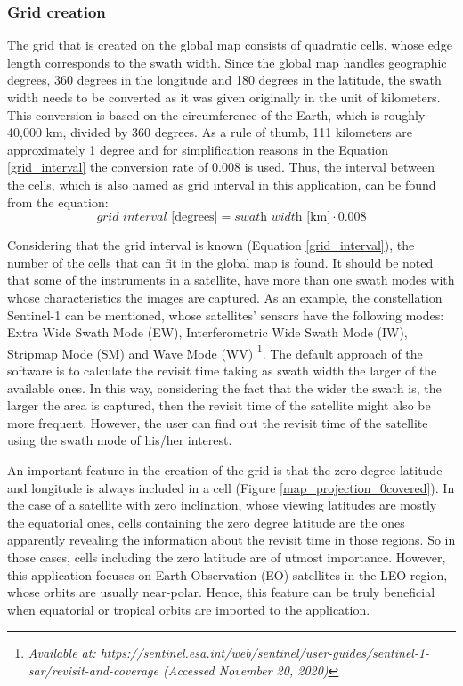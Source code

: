 \bigskip
\subsubsection{Grid creation}
\bigskip

The grid that is created on the global map consists of quadratic cells, whose edge length corresponds to the swath width. Since the global map handles geographic degrees, 360 degrees in the longitude and 180 degrees in the latitude, the swath width needs to be converted as it was given originally in the unit of kilometers. This conversion is based on the circumference of the Earth, which is roughly 40,000 km, divided by 360 degrees. As a rule of thumb, 111 kilometers are approximately 1 degree and for simplification reasons in the Equation \ref{grid_interval} the conversion rate of 0.008 is used. Thus, the interval between the cells, which is also named as grid interval in this application, can be found from the equation:
\begin{equation}
\label{grid_interval}
\textit{grid interval} \text{ [degrees]} = \textit{swath width} \text{ [km]} \cdot 0.008
\end{equation}

Considering that the grid interval is known (Equation \ref{grid_interval}), the number of the cells that can fit in the global map is found. It should be noted that some of the instruments in a satellite, have more than one swath modes with whose characteristics the images are captured. As an example, the constellation Sentinel-1 can be mentioned, whose satellites' sensors have the following modes: Extra Wide Swath Mode (EW), Interferometric Wide Swath Mode (IW), Stripmap Mode (SM) and Wave Mode (WV) \footnote{\label{Sentinel1_source}\textit{Available at: https://sentinel.esa.int/web/sentinel/user-guides/sentinel-1-sar/revisit-and-coverage (Accessed November 20, 2020)}}. The default approach of the software is to calculate the revisit time taking as swath width the larger of the available ones. In this way, considering the fact that the wider the swath is, the larger the area is captured, then the revisit time of the satellite might also be more frequent. However, the user can find out the revisit time of the satellite using the swath mode of his/her interest.

An important feature in the creation of the grid is that the zero degree latitude and longitude is always included in a cell (Figure \ref{map_projection_0covered}). In the case of a satellite with zero inclination, whose viewing latitudes are mostly the equatorial ones, cells containing the zero degree latitude are the ones apparently revealing the information about the revisit time in those regions. So in those cases, cells including the zero latitude are of utmost importance. However, this application focuses on Earth Observation (EO) satellites in the LEO region, whose orbits are usually near-polar. Hence, this feature can be truly beneficial when equatorial or tropical orbits are imported to the application.

